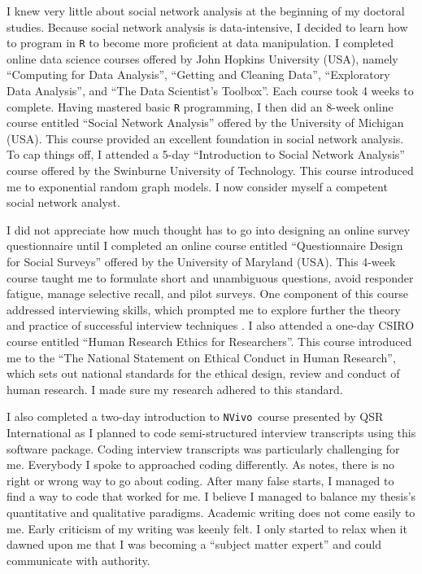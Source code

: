 \documentclass[12pt,table]{book}
\begin{document}
I knew very little about social network analysis at the beginning of my doctoral studies. Because social network analysis is data-intensive, I decided to learn how to program in \texttt{R} to become more proficient at data manipulation. I completed online data science courses offered by John Hopkins University (USA), namely \enquote{Computing for Data Analysis}, \enquote{Getting and Cleaning Data}, \enquote{Exploratory Data Analysis}, and \enquote{The Data Scientist's Toolbox}. Each course took 4 weeks to complete. Having mastered basic \texttt{R} programming, I then did an 8-week online course entitled \enquote{Social Network Analysis} offered by the University of Michigan (USA). This course provided an excellent foundation in social network analysis. To cap things off, I attended a 5-day \enquote{Introduction to Social Network Analysis} course offered by the Swinburne University of Technology. This course introduced me to exponential random graph models. I now consider myself a competent social network analyst. \medskip

I did not appreciate how much thought has to go into designing an online survey questionnaire until I completed an online course entitled \enquote{Questionnaire Design for Social Surveys} offered by the University of Maryland (USA). This 4-week course taught me to formulate short and unambiguous questions, avoid responder fatigue, manage selective recall, and pilot surveys. One component of this course addressed interviewing skills, which prompted me to explore further the theory and practice of successful interview techniques \citep[e.g.][]{kvale2008doing,seidman2012interviewing}. I also attended a one-day CSIRO course entitled \enquote{Human Research Ethics for Researchers}. This course introduced me to the \enquote{The National Statement on Ethical Conduct in Human Research}, which sets out national standards for the ethical design, review and conduct of human research. I made sure my research adhered to this standard. \medskip

I also completed a two-day introduction to \texttt{NVivo}\texttrademark\ course presented by QSR International as I planned to code semi-structured interview transcripts using this software package. Coding interview transcripts was particularly challenging for me. Everybody I spoke to approached coding differently. As \citet{saldana2015coding} notes, there is no right or wrong way to go about coding. After many false starts, I managed to find a way to code that worked for me. I believe I managed to balance my thesis's quantitative and qualitative paradigms. Academic writing does not come easily to me. Early criticism of my writing was keenly felt. I only started to relax when it dawned upon me that I was becoming a \enquote{subject matter expert} and could communicate with authority. \medskip
\end{document}

